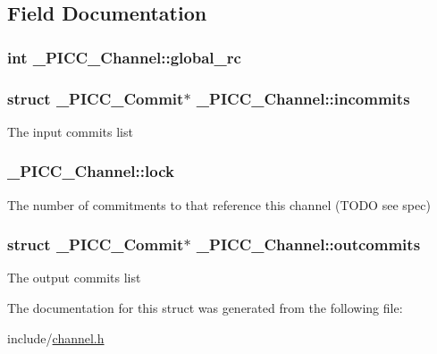 \subsection{Field Documentation}
\hypertarget{struct__PICC__Channel_a2a19db7029a1bf3b7d28e74bac691b09}{
\subsubsection[{global\-\_\-rc}]{\setlength{\rightskip}{0pt plus 5cm}int \-\_\-\-P\-I\-C\-C\-\_\-\-Channel\-::global\-\_\-rc}}\label{struct__PICC__Channel_a2a19db7029a1bf3b7d28e74bac691b09}
\hypertarget{struct__PICC__Channel_a7dbd850bbc98db0da80c381652d62f68}{
\subsubsection[{incommits}]{\setlength{\rightskip}{0pt plus 5cm}struct {\bf \-\_\-\-P\-I\-C\-C\-\_\-\-Commit}$\ast$ \-\_\-\-P\-I\-C\-C\-\_\-\-Channel\-::incommits}}\label{struct__PICC__Channel_a7dbd850bbc98db0da80c381652d62f68}
The input commits list \hypertarget{struct__PICC__Channel_a3d02581ff833cb6224c88d4657fb2c50}{
\subsubsection[{lock}]{ \-\_\-\-P\-I\-C\-C\-\_\-\-Channel\-::lock}}\label{struct__PICC__Channel_a3d02581ff833cb6224c88d4657fb2c50}
The number of commitments to that reference this channel (T\-O\-D\-O see spec) \hypertarget{struct__PICC__Channel_a75755c8cce2c82d51eac3ac9749f0418}{
\subsubsection[{outcommits}]{\setlength{\rightskip}{0pt plus 5cm}struct {\bf \-\_\-\-P\-I\-C\-C\-\_\-\-Commit}$\ast$ \-\_\-\-P\-I\-C\-C\-\_\-\-Channel\-::outcommits}}\label{struct__PICC__Channel_a75755c8cce2c82d51eac3ac9749f0418}
The output commits list 

The documentation for this struct was generated from the following file\-:\begin{DoxyCompactItemize}
\item 
include/\hyperlink{channel_8h}{channel.\-h}\end{DoxyCompactItemize}
